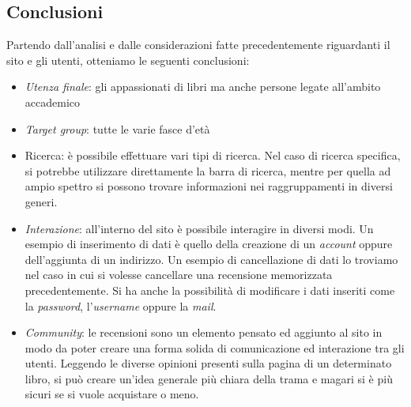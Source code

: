 \subsection{Conclusioni}
Partendo dall’analisi e dalle considerazioni fatte precedentemente riguardanti il sito e gli utenti, otteniamo le seguenti conclusioni:
\begin{itemize}
	\item \textit{Utenza finale}: gli appassionati di libri ma anche persone legate all'ambito accademico
	\item \textit{Target group}: tutte le varie fasce d’età
	\item Ricerca: è possibile effettuare vari tipi di ricerca. Nel caso di ricerca specifica, si potrebbe
utilizzare direttamente la barra di ricerca, mentre per quella ad ampio spettro si possono
trovare informazioni nei raggruppamenti in diversi generi.
	\item \textit{Interazione}: all’interno del sito è possibile interagire in diversi modi. Un esempio di inserimento di dati è quello della creazione di un \textit{account} oppure dell'aggiunta di un indirizzo. Un esempio di cancellazione di dati lo troviamo nel caso in cui si volesse cancellare una recensione memorizzata precedentemente. Si ha anche la possibilità di modificare i dati inseriti come la \textit{password}, l’\textit{username} oppure la \textit{mail}.
	\item \textit{Community}: le recensioni sono un elemento pensato ed aggiunto al sito in modo da poter creare una forma solida di comunicazione ed interazione tra gli utenti. Leggendo le diverse opinioni presenti sulla pagina di un determinato libro, si può creare un'idea generale più chiara della trama e magari si è più sicuri se si vuole acquistare o meno.
\end{itemize}

